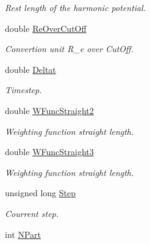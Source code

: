 \begin{DoxyCompactItemize}
\begin{DoxyCompactList}\small\item\em \-Rest length of the harmonic potential. \end{DoxyCompactList}\item 
\hypertarget{structGENERAL_aa72817c7da02760c6940e2e2fcea5f02}{double \hyperlink{structGENERAL_aa72817c7da02760c6940e2e2fcea5f02}{\-Re\-Over\-Cut\-Off}}\label{structGENERAL_aa72817c7da02760c6940e2e2fcea5f02}

\begin{DoxyCompactList}\small\item\em \-Convertion unit \-R\-\_\-e over \-Cut\-Off. \end{DoxyCompactList}\item 
\hypertarget{structGENERAL_ac321dc561843cb5d3f74604036a3a8da}{double \hyperlink{structGENERAL_ac321dc561843cb5d3f74604036a3a8da}{\-Deltat}}\label{structGENERAL_ac321dc561843cb5d3f74604036a3a8da}

\begin{DoxyCompactList}\small\item\em \-Timestep. \end{DoxyCompactList}\item 
\hypertarget{structGENERAL_a3e95eddffbcb7d50ef9588ced78a148c}{double \hyperlink{structGENERAL_a3e95eddffbcb7d50ef9588ced78a148c}{\-W\-Func\-Straight2}}\label{structGENERAL_a3e95eddffbcb7d50ef9588ced78a148c}

\begin{DoxyCompactList}\small\item\em \-Weighting function straight length. \end{DoxyCompactList}\item 
\hypertarget{structGENERAL_a2db5cd020420567f6c9414964981a572}{double \hyperlink{structGENERAL_a2db5cd020420567f6c9414964981a572}{\-W\-Func\-Straight3}}\label{structGENERAL_a2db5cd020420567f6c9414964981a572}

\begin{DoxyCompactList}\small\item\em \-Weighting function straight length. \end{DoxyCompactList}\item 
\hypertarget{structGENERAL_a7d089b5d5a5a8f8699325baad0ad85b5}{unsigned long \hyperlink{structGENERAL_a7d089b5d5a5a8f8699325baad0ad85b5}{\-Step}}\label{structGENERAL_a7d089b5d5a5a8f8699325baad0ad85b5}

\begin{DoxyCompactList}\small\item\em \-Courrent step. \end{DoxyCompactList}\item 
\hypertarget{structGENERAL_abdcc792391d8c5092471dff191de47f4}{int \hyperlink{structGENERAL_abdcc792391d8c5092471dff191de47f4}{\-N\-Part}}\label{structGENERAL_abdcc792391d8c5092471dff191de47f4}


\end{DoxyCompactItemize}
